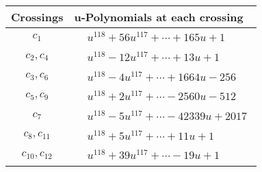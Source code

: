 \documentclass[1p]{elsarticle_modified}
\theoremstyle{definition}
\begin{document}
\begin{tabular}{m{50pt}|m{274pt}}
Crossings & \hspace{64pt}u-Polynomials at each crossing \\
\hline $$\begin{aligned}c_{1}\end{aligned}$$&$\begin{aligned}
&u^{118}+56 u^{117}+\cdots+165 u+1
\end{aligned}$\\
\hline $$\begin{aligned}c_{2},c_{4}\end{aligned}$$&$\begin{aligned}
&u^{118}-12 u^{117}+\cdots+13 u+1
\end{aligned}$\\
\hline $$\begin{aligned}c_{3},c_{6}\end{aligned}$$&$\begin{aligned}
&u^{118}-4 u^{117}+\cdots+1664 u-256
\end{aligned}$\\
\hline $$\begin{aligned}c_{5},c_{9}\end{aligned}$$&$\begin{aligned}
&u^{118}+2 u^{117}+\cdots-2560 u-512
\end{aligned}$\\
\hline $$\begin{aligned}c_{7}\end{aligned}$$&$\begin{aligned}
&u^{118}-5 u^{117}+\cdots-42339 u+2017
\end{aligned}$\\
\hline $$\begin{aligned}c_{8},c_{11}\end{aligned}$$&$\begin{aligned}
&u^{118}+5 u^{117}+\cdots+11 u+1
\end{aligned}$\\
\hline $$\begin{aligned}c_{10},c_{12}\end{aligned}$$&$\begin{aligned}
&u^{118}+39 u^{117}+\cdots-19 u+1
\end{aligned}$\\
\hline
\end{tabular}\\~\\
\newpage\renewcommand{\arraystretch}{1}
\end{document}

